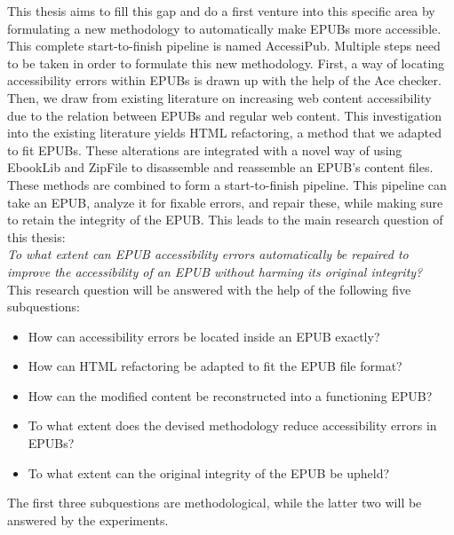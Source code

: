 This thesis aims to fill this gap and do a first venture into this specific area by formulating a new methodology to automatically make EPUBs more accessible. This complete start-to-finish pipeline is named AccessiPub. Multiple steps need to be taken in order to formulate this new methodology. First, a way of locating accessibility errors within EPUBs is drawn up with the help of the Ace checker. Then, we draw from existing literature on increasing web content accessibility due to the relation between EPUBs and regular web content. This investigation into the existing literature yields HTML refactoring, a method that we adapted to fit EPUBs. These alterations are integrated with a novel way of using EbookLib and ZipFile to disassemble and reassemble an EPUB's content files. These methods are combined to form a start-to-finish pipeline. This pipeline can take an EPUB, analyze it for fixable errors, and repair these, while making sure to retain the integrity of the EPUB. This leads to the main research question of this thesis: \\

\noindent\textit{To what extent can EPUB accessibility errors automatically be repaired to improve the accessibility of an EPUB without harming its original integrity?} \\

\noindent This research question will be answered with the help of the following five subquestions:
\begin{itemize}
    \item How can accessibility errors be located inside an EPUB exactly?
    \item How can HTML refactoring be adapted to fit the EPUB file format?
    \item How can the modified content be reconstructed into a functioning EPUB?
    \item To what extent does the devised methodology reduce accessibility errors in EPUBs?
    \item To what extent can the original integrity of the EPUB be upheld?\\
\end{itemize}

\noindent The first three subquestions are methodological, while the latter two will be answered by the experiments. 
